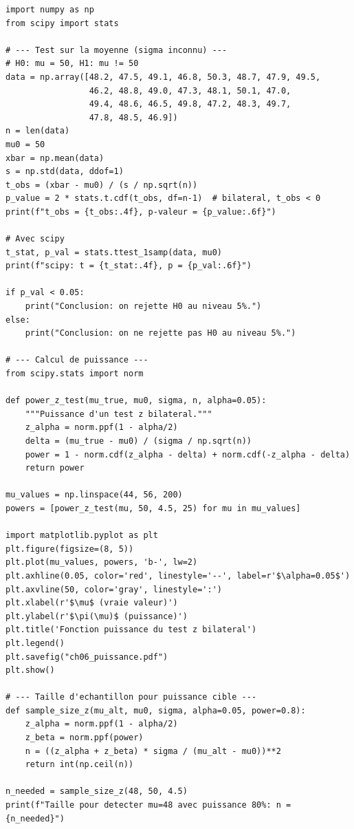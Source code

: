 \begin{python}
\begin{verbatim}
import numpy as np
from scipy import stats

# --- Test sur la moyenne (sigma inconnu) ---
# H0: mu = 50, H1: mu != 50
data = np.array([48.2, 47.5, 49.1, 46.8, 50.3, 48.7, 47.9, 49.5,
                 46.2, 48.8, 49.0, 47.3, 48.1, 50.1, 47.0,
                 49.4, 48.6, 46.5, 49.8, 47.2, 48.3, 49.7,
                 47.8, 48.5, 46.9])
n = len(data)
mu0 = 50
xbar = np.mean(data)
s = np.std(data, ddof=1)
t_obs = (xbar - mu0) / (s / np.sqrt(n))
p_value = 2 * stats.t.cdf(t_obs, df=n-1)  # bilateral, t_obs < 0
print(f"t_obs = {t_obs:.4f}, p-valeur = {p_value:.6f}")

# Avec scipy
t_stat, p_val = stats.ttest_1samp(data, mu0)
print(f"scipy: t = {t_stat:.4f}, p = {p_val:.6f}")

if p_val < 0.05:
    print("Conclusion: on rejette H0 au niveau 5%.")
else:
    print("Conclusion: on ne rejette pas H0 au niveau 5%.")

# --- Calcul de puissance ---
from scipy.stats import norm

def power_z_test(mu_true, mu0, sigma, n, alpha=0.05):
    """Puissance d'un test z bilateral."""
    z_alpha = norm.ppf(1 - alpha/2)
    delta = (mu_true - mu0) / (sigma / np.sqrt(n))
    power = 1 - norm.cdf(z_alpha - delta) + norm.cdf(-z_alpha - delta)
    return power

mu_values = np.linspace(44, 56, 200)
powers = [power_z_test(mu, 50, 4.5, 25) for mu in mu_values]

import matplotlib.pyplot as plt
plt.figure(figsize=(8, 5))
plt.plot(mu_values, powers, 'b-', lw=2)
plt.axhline(0.05, color='red', linestyle='--', label=r'$\alpha=0.05$')
plt.axvline(50, color='gray', linestyle=':')
plt.xlabel(r'$\mu$ (vraie valeur)')
plt.ylabel(r'$\pi(\mu)$ (puissance)')
plt.title('Fonction puissance du test z bilateral')
plt.legend()
plt.savefig("ch06_puissance.pdf")
plt.show()

# --- Taille d'echantillon pour puissance cible ---
def sample_size_z(mu_alt, mu0, sigma, alpha=0.05, power=0.8):
    z_alpha = norm.ppf(1 - alpha/2)
    z_beta = norm.ppf(power)
    n = ((z_alpha + z_beta) * sigma / (mu_alt - mu0))**2
    return int(np.ceil(n))

n_needed = sample_size_z(48, 50, 4.5)
print(f"Taille pour detecter mu=48 avec puissance 80%: n = {n_needed}")
\end{verbatim}
\end{python}

